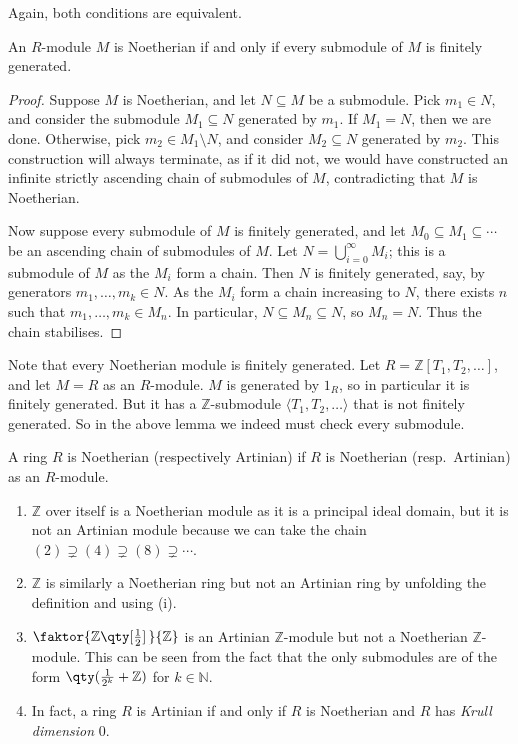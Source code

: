 Again, both conditions are equivalent.
\begin{lemma}
    An \( R \)-module \( M \) is Noetherian if and only if every submodule of \( M \) is finitely generated.
\end{lemma}
\begin{proof}
    Suppose \( M \) is Noetherian, and let \( N \subseteq M \) be a submodule.
    Pick \( m_1 \in N \), and consider the submodule \( M_1 \subseteq N \) generated by \( m_1 \).
    If \( M_1 = N \), then we are done.
    Otherwise, pick \( m_2 \in M_1 \setminus N \), and consider \( M_2 \subseteq N \) generated by \( m_2 \).
    This construction will always terminate, as if it did not, we would have constructed an infinite strictly ascending chain of submodules of \( M \), contradicting that \( M \) is Noetherian.

    Now suppose every submodule of \( M \) is finitely generated, and let \( M_0 \subseteq M_1 \subseteq \cdots \) be an ascending chain of submodules of \( M \).
    Let \( N = \bigcup_{i = 0}^\infty M_i \); this is a submodule of \( M \) as the \( M_i \) form a chain.
    Then \( N \) is finitely generated, say, by generators \( m_1, \dots, m_k \in N \).
    As the \( M_i \) form a chain increasing to \( N \), there exists \( n \) such that \( m_1, \dots, m_k \in M_n \).
    In particular, \( N \subseteq M_n \subseteq N \), so \( M_n = N \).
    Thus the chain stabilises.
\end{proof}
Note that every Noetherian module is finitely generated.
Let \( R = \mathbb Z[T_1, T_2, \dots] \), and let \( M = R \) as an \( R \)-module.
\( M \) is generated by \( 1_R \), so in particular it is finitely generated.
But it has a \( \mathbb Z \)-submodule \( \langle T_1, T_2, \dots \rangle \) that is not finitely generated.
So in the above lemma we indeed must check every submodule.
\begin{definition}
    A ring \( R \) is Noetherian (respectively Artinian) if \( R \) is Noetherian (resp.\ Artinian) as an \( R \)-module.
\end{definition}
\begin{example}
    \begin{enumerate}
        \item \( \mathbb Z \) over itself is a Noetherian module as it is a principal ideal domain, but it is not an Artinian module because we can take the chain \( (2) \supsetneq (4) \supsetneq (8) \supsetneq \cdots \).
        \item \( \mathbb Z \) is similarly a Noetherian ring but not an Artinian ring by unfolding the definition and using (i).
        \item \( \faktor{\mathbb Z\qty[\frac{1}{2}]\,}{\mathbb Z} \) is an Artinian \( \mathbb Z \)-module but not a Noetherian \( \mathbb Z \)-module. This can be seen from the fact that the only submodules are of the form \( \qty(\frac{1}{2^k} + \mathbb Z) \) for \( k \in \mathbb N \).
        \item In fact, a ring \( R \) is Artinian if and only if \( R \) is Noetherian and \( R \) has \emph{Krull dimension} 0.
    \end{enumerate}
\end{example}

